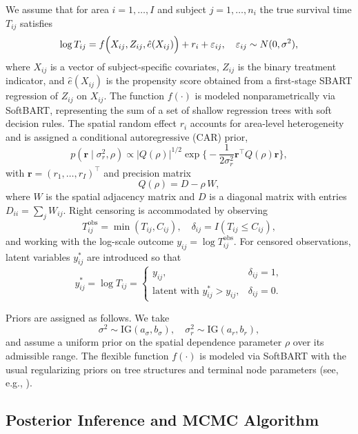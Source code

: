 \documentclass[useAMS,referee]{biom}
\begin{document}
We assume that for area $i=1,\ldots,I$ and subject $j=1,\ldots,n_i$ the true survival time $T_{ij}$ satisfies
\begin{equation} \label{eq:aftmodel}
\log T_{ij} = f\Bigl(X_{ij}, Z_{ij}, \hat{e}(X_{ij})\Bigr) + r_i + \varepsilon_{ij}, \quad \varepsilon_{ij}\sim N(0,\sigma^2),
\end{equation}
where $X_{ij}$ is a vector of subject-specific covariates, $Z_{ij}$ is the binary treatment indicator, and $\hat{e}(X_{ij})$ is the propensity score obtained from a first-stage SBART regression of $Z_{ij}$ on $X_{ij}$. The function $f(\cdot)$ is modeled nonparametrically via SoftBART, representing the sum of a set of shallow regression trees with soft decision rules. The spatial random effect $r_i$ accounts for area-level heterogeneity and is assigned a conditional autoregressive (CAR) prior,
\begin{equation} \label{eq:carprior}
p(\bm{r}\mid\sigma_r^2,\rho) \propto \vert Q(\rho)\vert^{1/2} \exp\Biggl\{-\frac{1}{2\sigma_r^2}\bm{r}^\top Q(\rho)\bm{r}\Biggr\},
\end{equation}
with $\bm{r}=(r_1,\ldots,r_I)^\top$ and precision matrix
\[
Q(\rho)=D-\rho\,W,
\]
where $W$ is the spatial adjacency matrix and $D$ is a diagonal matrix with entries $D_{ii}=\sum_jW_{ij}$. Right censoring is accommodated by observing
\[
T_{ij}^{\mathrm{obs}} = \min(T_{ij}, C_{ij}), \quad \delta_{ij}=I(T_{ij}\le C_{ij}),
\]
and working with the log-scale outcome $y_{ij}=\log T_{ij}^{\mathrm{obs}}$. For censored observations, latent variables $y_{ij}^\ast$ are introduced so that
\[
y_{ij}^\ast = \log T_{ij} = 
\begin{cases}
y_{ij}, & \delta_{ij}=1,\\[1mm]
\text{latent with } y_{ij}^\ast > y_{ij}, & \delta_{ij}=0.
\end{cases}
\]

Priors are assigned as follows. We take
\[
\sigma^2 \sim \mathrm{IG}(a_\sigma,b_\sigma),\quad \sigma_r^2 \sim \mathrm{IG}(a_r,b_r),
\]
and assume a uniform prior on the spatial dependence parameter $\rho$ over its admissible range. The flexible function $f(\cdot)$ is modeled via SoftBART with the usual regularizing priors on tree structures and terminal node parameters (see, e.g., \cite{chipman2010bart}).

\subsection{Posterior Inference and MCMC Algorithm}
\end{document}
